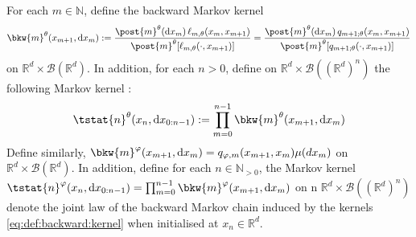 \documentclass{article}
\newcommand{\Xfd}{\mathcal{X}}
\newcommand{\uksymbol}{\ell}
\newcommand{\ud}[1]{\uksymbol_{#1}}
\newcommand{\nset}{\mathbb{N}}
\newcommand{\nsetpos}{\mathbb{N}_{> 0}}
\newcommand{\1}{\mathbbm{1}}
\newcommand{\uk}[1]{\mathbf{L}_{#1}}
\newcommand{\tensprod}{\otimes}
\newcommand{\Xset}{\mathsf{X}}
\newcommand{\parvec}{\theta}
\newcommand{\bmf}[1]{\set{F}(#1)}
\newcommand{\set}[1]{\mathsf{#1}}
\newcommand{\hd}[1]{q_{#1}}
\newcommand{\rmd}{\ensuremath{\mathrm{d}}}
\newcommand{\eqdef}{\ensuremath{:=}}
\begin{document}
For each $m \in \nset$, define the  backward Markov kernel 
\begin{equation} \label{eq:def:backward:kernel}
    \bkw{m}^\parvec(x_{m + 1}, \rmd x_m) \eqdef \frac{\post{m}^\parvec(\rmd x_m) \, \ud{m,\parvec}(x_m, x_{m + 1})}{\post{m}^\parvec[\ud{m,\parvec}(\cdot, x_{m + 1})]} = \frac{\post{m}^\parvec(\rmd x_m) \, \hd{m+1;\parvec}(x_{m}, x_{m+1})}{\post{m}^\parvec[\hd{m+1;\parvec}(\cdot, x_{m+1})]}
\end{equation}
on $\mathbb{R}^d \times \mathcal{B}(\mathbb{R}^d)$. In addition, for each $n>0$, define on $\mathbb{R}^d \times \mathcal{B}((\mathbb{R}^d)^n)$ the following Markov kernel  : 
\begin{equation} \label{eq:def:tstat}
\tstat{n}^\parvec(x_n, \rmd x_{0:n - 1}) \eqdef \prod_{m = 0}^{n - 1} \bkw{m}^\parvec(x_{m + 1}, \rmd x_m)
\end{equation}
Define similarly, $\bkw{m}^\varphi(x_{m + 1}, \rmd x_m) = q_{\varphi,m}(x_{m+1},x_m)\mu(dx_m)$
on $\mathbb{R}^d \times \mathcal{B}(\mathbb{R}^d)$. In addition, define for each $n \in \nsetpos$, the Markov kernel  $\tstat{n}^\varphi(x_n, \rmd x_{0:n - 1}) = \prod_{m = 0}^{n - 1} \bkw{m}^\varphi(x_{m + 1}, \rmd x_m)$ on n $\mathbb{R}^d \times \mathcal{B}((\mathbb{R}^d)^n)$ denote the joint law of the backward Markov chain induced by the kernels \eqref{eq:def:backward:kernel} when initialised at $x_n \in \mathbb{R}^d$. %
\end{document}
